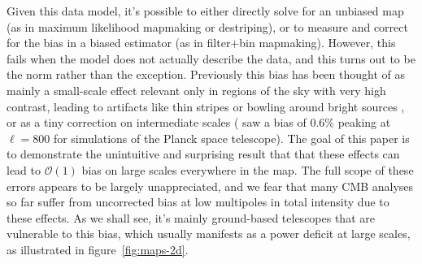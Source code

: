 \documentclass[twocolumn,apj]{aastex63}
\begin{document}
Given this data model, it's possible to either directly solve for
an unbiased map (as in maximum likelihood mapmaking or destriping),
or to measure and correct for the bias in a biased estimator
(as in filter+bin mapmaking). However, this fails when the model
does not actually describe the data, and this turns out to be
the norm rather than the exception. Previously this bias has
been thought of as mainly a small-scale effect relevant only in
regions of the sky with very high contrast, leading to artifacts
like thin stripes or bowling around bright sources \citep{xgls-2017,model-error},
or as a tiny correction on intermediate scales (\citet{planck-ml-bias-2006}
saw a bias of 0.6\% peaking at $\ell=800$ for simulations of the Planck
space telescope). The goal of this paper is to
demonstrate the unintuitive and surprising result that that these effects
can lead to $\mathcal{O}(1)$ bias on large scales everywhere
in the map. The full scope of these errors appears to be largely
unappreciated, and we fear that many CMB analyses
so far suffer from uncorrected bias at low multipoles in total intensity
due to these effects. As we shall see, it's mainly ground-based telescopes
that are vulnerable to this bias, which usually manifests as a power
deficit at large scales, as illustrated in figure~\ref{fig:maps-2d}.
\end{document}
